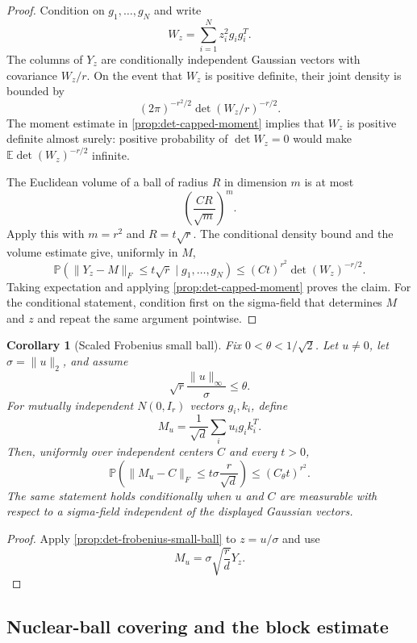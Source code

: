 \documentclass[11pt]{article}
\numberwithin{equation}{section}
\newtheorem{corollary}[theorem]{Corollary}
\theoremstyle{definition}
\theoremstyle{remark}
\newcommand{\E}{\mathbb E}
\newcommand{\Pp}{\mathbb P}
\newcommand{\1}{\boldsymbol 1}
\begin{document}
\begin{aiblock}
\begin{proof}
  Condition on $g_1,\ldots,g_N$ and write
  \[
    W_z=\sum_{i=1}^Nz_i^2g_ig_i^T.
  \]
  The columns of $Y_z$ are conditionally independent
  Gaussian vectors with covariance $W_z/r$. On the event
  that $W_z$ is positive definite, their joint density is
  bounded by
  \[
    (2\pi)^{-r^2/2}\det(W_z/r)^{-r/2}.
  \]
  The moment estimate in \cref{prop:det-capped-moment}
  implies that $W_z$ is positive definite almost surely:
  positive probability of $\det W_z=0$ would make
  $\E\det(W_z)^{-r/2}$ infinite.

  The Euclidean volume of a ball of radius $R$ in
  dimension $m$ is at most
  \[
    \left(\frac{C R}{\sqrt m}\right)^m.
  \]
  Apply this with $m=r^2$ and $R=t\sqrt r$. The
  conditional density bound and the volume estimate give,
  uniformly in $M$,
  \[
    \Pp(\|Y_z-M\|_F\le t\sqrt r\mid g_1,\ldots,g_N)
    \le(Ct)^{r^2}\det(W_z)^{-r/2}.
  \]
  Taking expectation and applying
  \cref{prop:det-capped-moment} proves the claim. For the
  conditional statement, condition first on the
  sigma-field that determines $M$ and $z$ and repeat the
  same argument pointwise.
\end{proof}

\begin{corollary}[Scaled Frobenius small ball]
  \label{cor:det-scaled-frobenius}
  Fix $0<\theta<1/\sqrt2$. Let $u\ne0$, let
  $\sigma=\|u\|_2$, and assume
  \[
    \sqrt r\frac{\|u\|_\infty}{\sigma}\le\theta.
  \]
  For mutually independent $N(0,I_r)$ vectors $g_i,k_i$,
  define
  \[
    M_u=\frac1{\sqrt d}\sum_i u_ig_ik_i^T.
  \]
  Then, uniformly over independent centers $C$ and every
  $t>0$,
  \[
    \Pp\left(\|M_u-C\|_F\le t\sigma\frac r{\sqrt d}\right)
    \le (C_\theta t)^{r^2}.
  \]
  The same statement holds conditionally when $u$ and $C$
  are measurable with respect to a sigma-field independent
  of the displayed Gaussian vectors.
\end{corollary}

\begin{proof}
  Apply \cref{prop:det-frobenius-small-ball} to
  $z=u/\sigma$ and use
  \[
    M_u=\sigma\sqrt{\frac rd}Y_z.
  \]
\end{proof}

\subsection{Nuclear-ball covering and the block estimate}


\end{aiblock}
\end{document}
